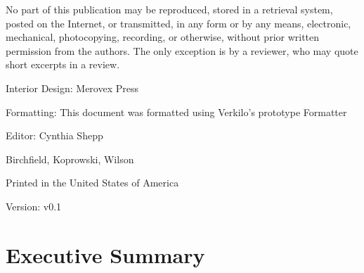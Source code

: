 \documentclass[11pt,openany]{book}
\begin{document}
  \footnotesize
  \par\noindent No part of this publication may be reproduced, stored in
a retrieval system, posted on the Internet, or transmitted, in any form
or by any means, electronic, mechanical, photocopying, recording, or
otherwise, without prior written permission from the authors. The only
exception is by a reviewer, who may quote short excerpts in a
review.\newline


  \footnotesize
  

  \par\noindent Interior Design: Merovex Press %
      \par\noindent Formatting: This document was formatted using
Verkilo's prototype Formatter
      \par\noindent Editor: Cynthia Shepp
  \newline

  \par\noindent       \par\noindent Birchfield, Koprowski, Wilson
    \newline

  
  \par\noindent Printed in the United States of America
  \newline

  
    \par\noindent Version: v0.1
    \vspace*{\fill}
  \clearpage\normalsize

  
              {
            \makeatletter
      \renewcommand*\l@section{\@dottedtocline{1}{1.5em}{3.0em}}
      \makeatother
      \setcounter{tocdepth}{2}
      \tableofcontents
    }
      
      \listoftables
  
      \listoffigures
  
\newpage %

\pagestyle{fancy}
\hypertarget{executive-summary}{%
\chapter{Executive Summary}\label{executive-summary}}
\end{document}
